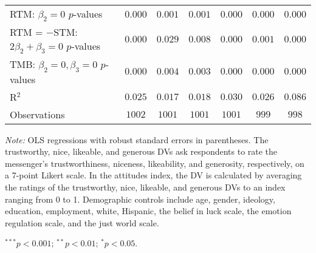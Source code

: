\begin{table}[!t]
\begin{center}
{\begin{threeparttable}
\begin{tabular}{l c c c c c c}
RTM: $\beta_2 = 0$ $p$-values                   & $0.000$       & $0.001$       & $0.001$       & $0.000$       & $0.000$       & $0.000$       \\
RTM = $-$STM: $2\beta_2+\beta_3 = 0$ $p$-values & $0.000$       & $0.029$       & $0.008$       & $0.000$       & $0.001$       & $0.000$       \\
TMB: $\beta_2 = 0, \beta_3 = 0$ $p$-values      & $0.000$       & $0.004$       & $0.003$       & $0.000$       & $0.000$       & $0.000$       \\
R$^2$                                           & $0.025$       & $0.017$       & $0.018$       & $0.030$       & $0.026$       & $0.086$       \\
Observations                                    & $1002$        & $1001$        & $1001$        & $1001$        & $999$         & $998$         \\
\bottomrule
\end{tabular}
\begin{tablenotes}[flushleft]
\scriptsize{\item[\hspace{-5mm}] \textit{Note:} OLS regressions with robust standard errors in parentheses. 
            The trustworthy, nice, likeable, and generous DVs ask respondents to rate the messenger's trustworthiness, niceness, likeability, and generosity, respectively,
on a 7-point Likert scale. In the attitudes index, the DV is calculated by averaging the ratings of the trustworthy, nice, likeable, and generous DVs to an index ranging from 0 to 1. 
                                Demographic controls include age, gender, ideology,
                                education, employment, white, Hispanic, the belief in luck scale, the emotion regulation scale, and the just world scale. \item[\hspace{-5mm}] $^{***}p<0.001$; $^{**}p<0.01$; $^{*}p<0.05$.}
\end{tablenotes}
\end{threeparttable}
}
\label{tab:attitude_shared_regression}
\end{center}
\end{table}

\renewcommand{\baselinestretch}{1.67}%
